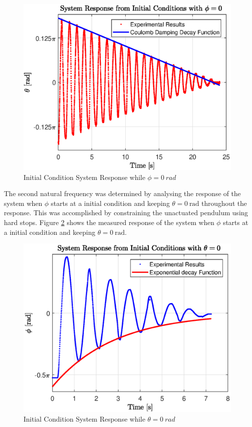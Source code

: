 \begin{figure}[h]
	\centering
	\includegraphics[scale=1]{./figs/q1_initial_response.eps}
	\caption{Initial Condition System Response while $ \phi = \SI{0}{rad} $ }
	\label{fig:q1_response}
\end{figure}


The second natural frequency was determined by analysing the response of the system when $\phi$ starts at a initial condition and keeping $\theta = \SI{0}{\radian}$ throughout the response. This was accomplished by constraining the unactuated pendulum using hard stops. Figure \ref{fig:q2_response} shows the measured response of the system when $\phi$ starts at a initial condition and keeping $\theta = \SI{0}{\radian} $.\\

\begin{figure}[h]
	\centering
	\includegraphics[scale=1]{./figs/q2_initial_response.eps}
	\caption{Initial Condition System Response while $ \theta = \SI{0}{rad} $ }
	\label{fig:q2_response}
\end{figure}

